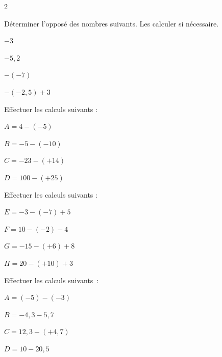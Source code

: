 \begin{multicols}{2}
    \begin{exercice}{}{}
        Déterminer l'opposé des nombres suivants. Les calculer si nécessaire.
        \begin{enumeratebf}
            \item $-3$
            \item $-5,2$
            \item $-(-7)$
            \item $-(-2,5) + 3$
        \end{enumeratebf}
    \end{exercice}


    \begin{exercice}{}{}
        Effectuer les calculs suivants :
        \begin{enumeratebf}
            \item $A = 4 - (-5)$
            \item $B = -5 - (-10)$
            \item $C = -23 - (+14)$
            \item $D = 100 - (+25)$
        \end{enumeratebf}
    \end{exercice}
    \begin{exercice}{}{}
        Effectuer les calculs suivants :
        \begin{enumeratebf}
            \item $E = -3 - (-7) + 5$
            \item $F = 10 - (-2) - 4$
            \item $G = -15 - (+6) + 8$
            \item $H = 20 - (+10) + 3$
        \end{enumeratebf}
    \end{exercice}
    \begin{exercice}{}{}
        Effectuer les calculs suivants~:
        \begin{enumeratebf}
            \item $A = (-5) - (-3)$
            \item $B = -4,3 - 5,7$
            \item $C = 12,3 - (+4,7)$
            \item $D = 10 - 20,5$
        \end{enumeratebf}
    \end{exercice}
\end{multicols}